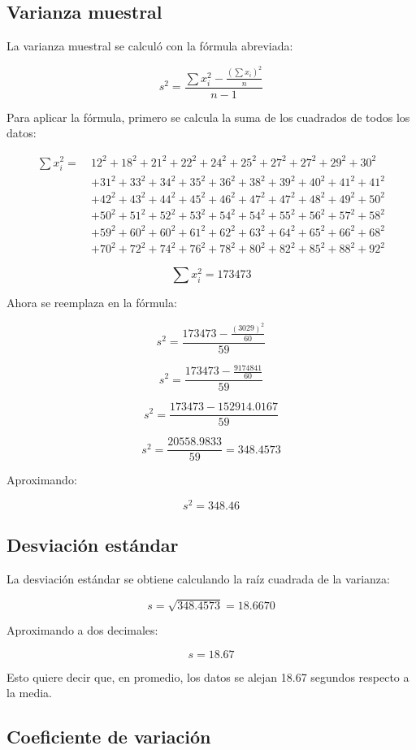 \documentclass[12pt,letterpaper]{article}
\begin{document}
\subsection{Varianza muestral}

La varianza muestral se calculó con la fórmula abreviada:

\[
s^2=\frac{\sum x_i^2-\frac{(\sum x_i)^2}{n}}{n-1}
\]

Para aplicar la fórmula, primero se calcula la suma de los cuadrados de todos los datos:

\begin{align*}
\sum x_i^2 =\ &12^2+18^2+21^2+22^2+24^2+25^2+27^2+27^2+29^2+30^2 \\
&+31^2+33^2+34^2+35^2+36^2+38^2+39^2+40^2+41^2+41^2 \\
&+42^2+43^2+44^2+45^2+46^2+47^2+47^2+48^2+49^2+50^2 \\
&+50^2+51^2+52^2+53^2+54^2+54^2+55^2+56^2+57^2+58^2 \\
&+59^2+60^2+60^2+61^2+62^2+63^2+64^2+65^2+66^2+68^2 \\
&+70^2+72^2+74^2+76^2+78^2+80^2+82^2+85^2+88^2+92^2
\end{align*}

\[
\sum x_i^2 = 173473
\]

Ahora se reemplaza en la fórmula:

\[
s^2=\frac{173473-\frac{(3029)^2}{60}}{59}
\]

\[
s^2=\frac{173473-\frac{9174841}{60}}{59}
\]

\[
s^2=\frac{173473-152914.0167}{59}
\]

\[
s^2=\frac{20558.9833}{59}=348.4573
\]

Aproximando:

\[
s^2=348.46
\]

\subsection{Desviación estándar}

La desviación estándar se obtiene calculando la raíz cuadrada de la varianza:

\[
s=\sqrt{348.4573}=18.6670
\]

Aproximando a dos decimales:

\[
s=18.67
\]

Esto quiere decir que, en promedio, los datos se alejan 18.67 segundos respecto a la media.

\subsection{Coeficiente de variación}
\end{document}
